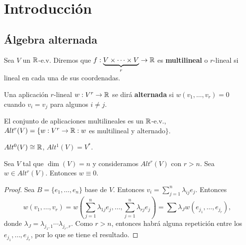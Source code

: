 \documentclass[CV.tex]{subfiles}
\begin{document}

\chapter{Introducción}
\section{Álgebra alternada}
\begin{defi}
Sea $V$ un $\mathbb{R}$-e.v. Diremos que $f:\underbrace{V\times\dots\times V}_{r}\to\mathbb{R}$ es \textbf{multilineal} o $r$-lineal si lineal en cada una de sus coordenadas.

Una aplicación $r$-lineal $w:V^r\to\mathbb{R}$ se dirá \textbf{alternada} si $w(v_1,\dots, v_r)=0$ cuando $v_i=v_j$ para algunos $i\neq j$. 
\end{defi}

El conjunto de aplicaciones multilineales es un $\mathbb{R}$-e.v., $Alt^r(V)=\{w:V^r\to\mathbb{R}: w$ es multilineal y alternado$\}$. 
\begin{ej}
$Alt^0(V)\cong\mathbb{R}$, $Alt^1(V)=V^*$.
\end{ej}

\begin{lemma}
Sea $V$ tal que $\dim(V)=n$ y consideramos $Alt^r(V)$ con $r>n$. Sea $w\in Alt^r(V)$. Entonces $w\equiv 0$.
\end{lemma}
\begin{proof}
Sea $B=\{e_1,\dots, e_n\}$ base de $V$. Entonces $v_i=\sum_{j=1}^n\lambda_{ij}e_j$. Entonces
$$
w(v_1,\dots, v_r)=w\left(\sum_{j=1}^n\lambda_{1j}e_j,\dots,\sum_{j=1}^n\lambda_{rj}e_j\right)=\sum\lambda_Jw(e_{j_1},\dots, e_{j_r}),$$
donde $\lambda_J=\lambda_{j_1,1}\cdots\lambda_{j_r,r}$. Como $r>n$, entonces habrá alguna repetición entre los $e_{j_1},\dots, e_{j_r}$, por lo que se tiene el resultado.
\end{proof}
\end{document}
